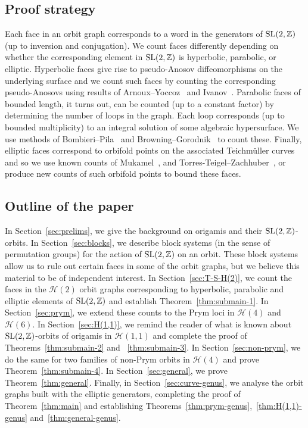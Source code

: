 \documentclass[a4paper,11pt]{amsart}
\numberwithin{equation}{section}
\numberwithin{figure}{section}
\numberwithin{table}{section}
\newcommand{\teichmuller}{Teichm{\"u}ller }
\newcommand{\calH}{\mathcal{H}}
\newcommand{\Z}{\mathbb{Z}}
\DeclareMathOperator{\SL}{{\rm{SL}}}
\begin{document}

\subsection{Proof strategy} Each face in an orbit graph corresponds to a word in the generators of $\SL(2,\Z)$ (up to inversion and conjugation). We count faces differently depending on whether the corresponding element in $\SL(2,\Z)$ is hyperbolic, parabolic, or elliptic. Hyperbolic faces give rise to pseudo-Anosov diffeomorphisms on the underlying surface and we count such faces by counting the corresponding pseudo-Anosovs using results of Arnoux--Yoccoz~\cite{AY} and Ivanov~\cite{Iva}. Parabolic faces of bounded length, it turns out, can be counted (up to a constant factor) by determining the number of loops in the graph. Each loop corresponds (up to bounded multiplicity) to an integral solution of some algebraic hypersurface. We use methods of Bombieri--Pila~\cite{BoPi} and Browning--Gorodnik~\cite{BG} to count these. Finally, elliptic faces correspond to orbifold points on the associated \teichmuller curves and so we use known counts of Mukamel~\cite{Muk}, and Torres-Teigel--Zachhuber~\cite{TTZ18,TTZ19}, or produce new counts of such orbifold points to bound these faces.


\subsection{Outline of the paper} In Section~\ref{sec:prelims}, we give the background on origamis and their $\SL(2,\Z)$-orbits. In Section~\ref{sec:blocks}, we describe block systems (in the sense of permutation groups) for the action of $\SL(2,\Z)$ on an orbit. These block systems allow us to rule out certain faces in some of the orbit graphs, but we believe this material to be of independent interest. In Section~\ref{sec:T-S-H(2)}, we count the faces in the $\calH(2)$ orbit graphs corresponding to hyperbolic, parabolic and elliptic elements of $\SL(2,\Z)$ and establish Theorem~\ref{thm:submain-1}. In Section~\ref{sec:prym}, we extend these counts to the Prym loci in $\calH(4)$ and $\calH(6)$. In Section~\ref{sec:H(1,1)}, we remind the reader of what is known about $\SL(2,\Z)$-orbits of origamis in $\calH(1,1)$ and complete the proof of Theorems~\ref{thm:submain-2} and ~\ref{thm:submain-3}. In Section~\ref{sec:non-prym}, we do the same for two families of non-Prym orbits in $\calH(4)$ and prove Theorem~\ref{thm:submain-4}. In Section~\ref{sec:general}, we prove Theorem~\ref{thm:general}. Finally, in Section~\ref{sec:curve-genus}, we analyse the orbit graphs built with the elliptic generators, completing the proof of Theorem~\ref{thm:main} and establishing Theorems~\ref{thm:prym-genus},~\ref{thm:H(1,1)-genus} and~\ref{thm:general-genus}.
\end{document}
